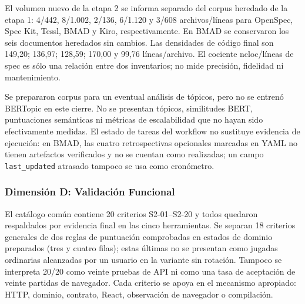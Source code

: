 El volumen nuevo de la etapa 2 se informa separado del corpus heredado de la etapa 1: 4/442, 8/1.002, 2/136, 6/1.120 y 3/608 archivos/líneas para OpenSpec, Spec Kit, Tessl, BMAD y Kiro, respectivamente. En BMAD se conservaron los seis documentos heredados sin cambios. Las densidades de código final son 149,20; 136,97; 128,59; 170,00 y 99,76 líneas/archivo. El cociente ncloc/líneas de spec es sólo una relación entre dos inventarios; no mide precisión, fidelidad ni mantenimiento.

Se prepararon corpus para un eventual análisis de tópicos, pero no se entrenó BERTopic en este cierre. No se presentan tópicos, similitudes BERT, puntuaciones semánticas ni métricas de escalabilidad que no hayan sido efectivamente medidas. El estado de tareas del workflow no sustituye evidencia de ejecución: en BMAD, las cuatro retrospectivas opcionales marcadas en YAML no tienen artefactos verificados y no se cuentan como realizadas; un campo \texttt{last\_updated} atrasado tampoco se usa como cronómetro.

\subsubsection{Dimensión D: Validación Funcional}

El catálogo común contiene 20 criterios S2-01--S2-20 y todos quedaron respaldados por evidencia final en las cinco herramientas. Se separan 18 criterios generales de dos reglas de puntuación comprobadas en estados de dominio preparados (tres y cuatro filas); estas últimas no se presentan como jugadas ordinarias alcanzadas por un usuario en la variante sin rotación. Tampoco se interpreta 20/20 como veinte pruebas de API ni como una tasa de aceptación de veinte partidas de navegador. Cada criterio se apoya en el mecanismo apropiado: HTTP, dominio, contrato, React, observación de navegador o compilación.

